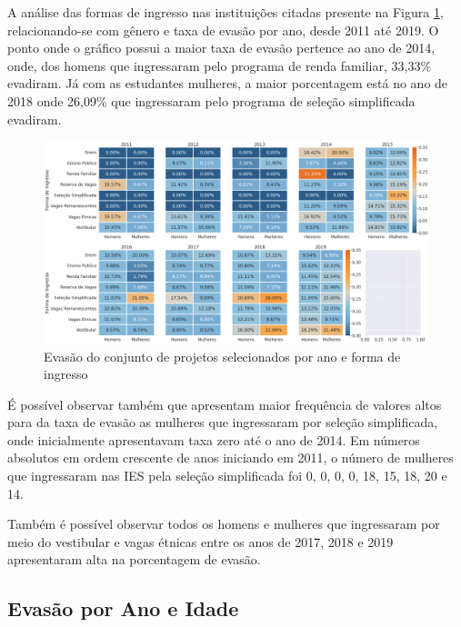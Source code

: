 A análise das formas de ingresso nas instituições citadas presente na Figura \ref{fig:calorFormaIngresso}, relacionando-se com gênero e taxa de evasão por ano, desde 2011 até 2019. O ponto onde o gráfico possui a maior taxa de evasão pertence ao ano de 2014, onde, dos homens que ingressaram pelo programa de renda familiar, 33,33\% evadiram. Já com as estudantes mulheres, a maior porcentagem está no ano de 2018 onde 26,09\% que ingressaram pelo programa de seleção simplificada evadiram. 

\begin{figure}[H]
\centering
\includegraphics[width=1\textwidth]{Figuras/calorFormaIngresso.png}
\caption{Evasão do conjunto de projetos selecionados por ano e forma de ingresso}
\label{fig:calorFormaIngresso}
\end{figure}

É possível observar também que apresentam maior frequência de valores altos para da taxa de evasão as mulheres que ingressaram por seleção simplificada, onde inicialmente apresentavam taxa zero até o ano de 2014. Em números absolutos em ordem crescente de anos iniciando em 2011, o número de mulheres que ingressaram nas IES pela seleção simplificada foi 0, 0, 0, 0, 18, 15, 18, 20 e 14.

Também é possível observar todos os homens e mulheres que ingressaram por meio do vestibular e vagas étnicas entre os anos de 2017, 2018 e 2019 apresentaram alta na porcentagem de evasão.


\subsection{Evasão por Ano e Idade}\label{sub:calorIdade}


